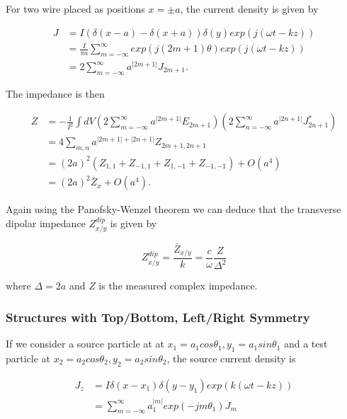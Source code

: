 \documentclass[review, number, sort&compress]{elsarticle}
\begin{document}
For two wire placed as positions $x = \pm a$, the current density is given by \cite{Tsutsui:OnSingleWire}

\begin{align}
J & =  I \left( \delta \left( x - a \right) - \delta \left( x + a  \right) \right) \delta (y) exp \left( j \left( \omega t - kz \right) \right) \nonumber \\
& =  \frac{I}{\pi a} \displaystyle\sum\limits_{m=-\infty}^{\infty} exp \left(j \left( 2m +1 \right) \theta \right) exp \left( j \left( \omega t - kz \right) \right) \nonumber \\
& =  2\displaystyle\sum\limits_{m=-\infty}^{\infty} a^{|2m + 1 |} J_{2m + 1}.
\end{align}

The impedance is then

\begin{align}
Z & =  - \frac{1}{I^{2}} \int dV \left( 2\displaystyle\sum\limits_{m=-\infty}^{\infty} a^{|2m + 1 |} E_{2m + 1}  \right)  \left( 2\displaystyle\sum\limits_{n=-\infty}^{\infty} a^{|2n + 1 |} J_{2n + 1}^{*}  \right) \nonumber \\
& =  4 \displaystyle\sum\limits_{m,n} a^{|2m + 1 | + |2n + 1|} Z_{2m + 1, 2n+1} \nonumber \\
& =  \left(2a \right)^{2}\left( Z_{1,1} + Z_{-1,1} + Z_{1,-1} + Z_{-1,-1} \right) + O(a^{4}) \nonumber \\
& =  (2a)^{2}\bar{Z}_{x} + O(a^{4}). 
\end{align}

Again using the Panofsky-Wenzel theorem we can deduce that the transverse dipolar impedance $Z^{dip}_{x/y}$ is given by 

\begin{equation}
Z^{dip}_{x/y} = \frac{\bar{Z}_{x/y}}{k} = \frac{c}{\omega} \frac{Z}{\Delta^{2}}
\end{equation}

where $\Delta = 2a$ and $Z$ is the measured complex impedance.

\subsubsection{Structures with Top/Bottom, Left/Right Symmetry}

If we consider a source particle at at $x_{1} = a_{1}cos\theta_{1}, y_{1} = a_{1}sin\theta_{1}$ and a test particle at $x_{2} = a_{2}cos\theta_{2}, y_{2} = a_{2}sin\theta_{2}$, the source current density is

\begin{align}
J_{z} &= I\delta \left( x-x_{1} \right) \delta \left( y-y_{1} \right) exp \left( k \left( \omega t - kz \right) \right) \nonumber \\
          &=\displaystyle\sum\limits_{m=-\infty}^{\infty}a_{1}^{|m|}exp\left( -jm\theta_{1} \right) J_{m}
\end{align}
\end{document}
